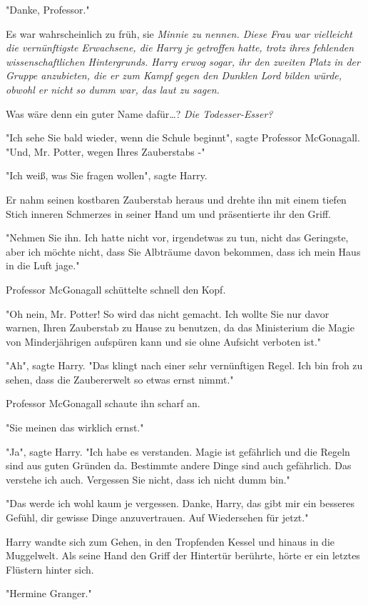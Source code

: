{"Danke, Professor."

Es war wahrscheinlich zu früh, sie \emph{Minnie zu nennen. Diese Frau war vielleicht die vernünftigste Erwachsene, die Harry je getroffen hatte, trotz ihres fehlenden wissenschaftlichen Hintergrunds. Harry erwog sogar, ihr den zweiten Platz in der Gruppe anzubieten, die er zum Kampf gegen den Dunklen Lord bilden würde, obwohl er nicht so dumm war, das laut zu sagen.}

Was wäre denn ein guter Name dafür…? \emph{Die Todesser-Esser?}

"Ich sehe Sie bald wieder, wenn die Schule beginnt", sagte Professor McGonagall. "Und, Mr. Potter, wegen Ihres Zauberstabs -"

"Ich weiß, was Sie fragen wollen", sagte Harry.

Er nahm seinen kostbaren Zauberstab heraus und drehte ihn mit einem tiefen Stich inneren Schmerzes in seiner Hand um und präsentierte ihr den Griff.

"Nehmen Sie ihn. Ich hatte nicht vor, irgendetwas zu tun, nicht das Geringste, aber ich möchte nicht, dass Sie Albträume davon bekommen, dass ich mein Haus in die Luft jage."

Professor McGonagall schüttelte schnell den Kopf.

"Oh nein, Mr. Potter! So wird das nicht gemacht. Ich wollte Sie nur davor warnen, Ihren Zauberstab zu Hause zu benutzen, da das Ministerium die Magie von Minderjährigen aufspüren kann und sie ohne Aufsicht verboten ist."

"Ah", sagte Harry. "Das klingt nach einer sehr vernünftigen Regel. Ich bin froh zu sehen, dass die Zaubererwelt so etwas ernst nimmt."

Professor McGonagall schaute ihn scharf an.

"Sie meinen das wirklich ernst."

"Ja", sagte Harry. "Ich habe es verstanden. Magie ist gefährlich und die Regeln sind aus guten Gründen da. Bestimmte andere Dinge sind auch gefährlich. Das verstehe ich auch. Vergessen Sie nicht, dass ich nicht dumm bin."

"Das werde ich wohl kaum je vergessen. Danke, Harry, das gibt mir ein besseres Gefühl, dir gewisse Dinge anzuvertrauen. Auf Wiedersehen für jetzt."

Harry wandte sich zum Gehen, in den Tropfenden Kessel und hinaus in die Muggelwelt. Als seine Hand den Griff der Hintertür berührte, hörte er ein letztes Flüstern hinter sich.

"Hermine Granger."

}
